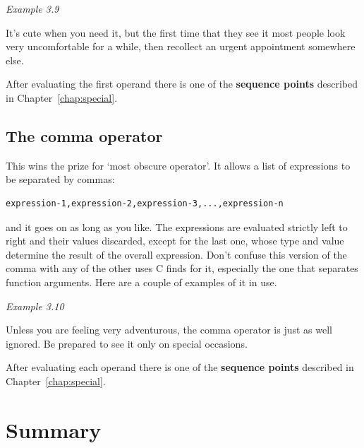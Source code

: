    \begin{center}\textit{Example 3.9}\end{center}


   It's cute when you need it, but the first time that they see it most
    people look very uncomfortable for a while, then recollect an urgent
    appointment somewhere else.


   After evaluating the first operand there is one of the \textbf{sequence
    points} described in Chapter~\ref{chap:special}.



  

  \subsection{The comma operator}
   

   This wins the prize for `most obscure operator'. It allows a list
    of expressions to be separated by commas:


   \begin{Verbatim}
expression-1,expression-2,expression-3,...,expression-n
\end{Verbatim}

   and it goes on as long as you like. The expressions are
    evaluated strictly left to right and their values discarded, except for
    the last one, whose type and value determine the result of the overall
    expression. Don't confuse this version of the comma with any of the other
    uses C finds for it, especially the one that separates function arguments.
    Here are a couple of examples of it in use.


   \begin{center}\textit{Example 3.10}\end{center}


   Unless you are feeling very adventurous, the comma operator is just as
    well ignored. Be prepared to see it only on special occasions.


   After evaluating each operand there is one of the \textbf{sequence
    points} described in Chapter~\ref{chap:special}.


  

 
        \section{Summary}
        


